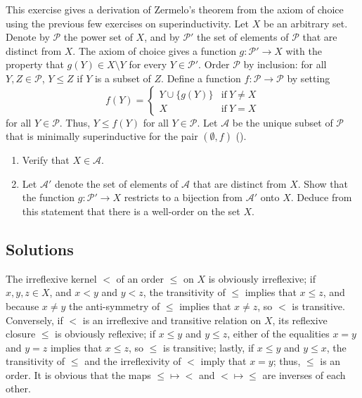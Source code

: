 \documentclass{article}
\begin{document}
\begin{exercise}
  \label{exe:m0vdltb2}
  This exercise gives a derivation of Zermelo's theorem from the axiom
  of choice using the previous few exercises on superinductivity.  Let
  \(X\) be an arbitrary set.  Denote by \(\mathcal{P}\) the power set
  of \(X\), and by \(\mathcal{P}'\) the set of elements of
  \(\mathcal{P}\) that are distinct from \(X\).  The axiom of choice
  gives a function \(g : \mathcal{P}' \to X\) with the property that
  \(g(Y) \in X \setminus Y\) for every \(Y \in \mathcal{P}'\).  Order
  \(\mathcal{P}\) by inclusion: for all \(Y, Z \in \mathcal{P}\),
  \(Y \leq Z\) if \(Y\) is a subset of \(Z\).  Define a function
  \(f : \mathcal{P} \to \mathcal{P}\) by setting
  \begin{displaymath}
    f(Y) =
    \begin{cases}
      Y \cup \{ g(Y) \} & \text{if} ~ Y \neq X \\
      X & \text{if} ~ Y = X
    \end{cases}
  \end{displaymath}
  for all \(Y \in \mathcal{P}\).  Thus, \(Y \leq f(Y)\) for all
  \(Y \in \mathcal{P}\).  Let \(\mathcal{A}\) be the unique subset of
  \(\mathcal{P}\) that is minimally superinductive for the pair
  \((\emptyset, f)\) ().
  \begin{enumerate}
  \item Verify that \(X \in \mathcal{A}\).
  \item Let \(\mathcal{A}'\) denote the set of elements of
    \(\mathcal{A}\) that are distinct from \(X\).  Show that the
    function \(g : \mathcal{P}' \to X\) restricts to a bijection from
    \(\mathcal{A}'\) onto \(X\).  Deduce from this statement that
    there is a well-order on the set \(X\).
  \end{enumerate}
\end{exercise}

\subsection{Solutions}
\label{sec:fzhm4l61}

\begin{solution}[\ref{exe:eydusvz3}]
  \label{sol:bxkmo56h}
  The irreflexive kernel \(<\) of an order \(\leq\) on \(X\) is
  obviously irreflexive; if \(x,y,z \in X\), and \(x < y\) and
  \(y < z\), the transitivity of \(\leq\) implies that \(x \leq z\),
  and because \(x \neq y\) the anti-symmetry of \(\leq\) implies that
  \(x \neq z\), so \(<\) is transitive.  Conversely, if \(<\) is an
  irreflexive and transitive relation on \(X\), its reflexive closure
  \(\leq\) is obviously reflexive; if \(x \leq y\) and \(y \leq z\),
  either of the equalities \(x = y\) and \(y = z\) implies that
  \(x \leq z\), so \(\leq\) is transitive; lastly, if \(x \leq y\) and
  \(y \leq x\), the transitivity of \(\leq\) and the irreflexivity of
  \(<\) imply that \(x = y\); thus, \(\leq\) is an order.  It is
  obvious that the maps \(\leq \mapsto <\) and \(< \mapsto \leq\) are
  inverses of each other.
\end{solution}
\end{document}
